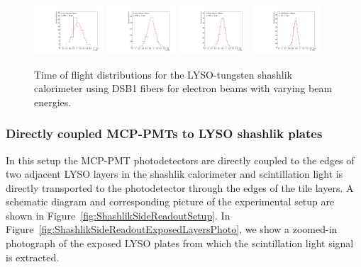 \documentclass[12pt]{article}
\begin{document}
\begin{figure}[H] \centering
\includegraphics[width=0.23\textwidth]{figs/TOF_ShashlikDSB1Fiber_Electron_4GeV} 
\includegraphics[width=0.23\textwidth]{figs/TOF_ShashlikDSB1Fiber_Electron_8GeV} 
\includegraphics[width=0.23\textwidth]{figs/TOF_ShashlikDSB1Fiber_Electron_16GeV} 
\includegraphics[width=0.23\textwidth]{figs/TOF_ShashlikDSB1Fiber_Electron_32GeV} 
\caption{\small Time of flight distributions for the LYSO-tungsten shashlik calorimeter
using DSB1 fibers for electron beams with varying beam energies.} 
\label{fig:ShashlikFiberTOF}
\end{figure}


\subsubsection{Directly coupled MCP-PMTs to LYSO shashlik plates}

In this setup the MCP-PMT photodetectors are directly coupled to the edges of two adjacent LYSO layers in the shashlik
calorimeter and scintillation light is directly transported to the photodetector
through the edges of the tile layers. A schematic diagram and corresponding
picture  of the experimental setup are shown in
Figure~\ref{fig:ShashlikSideReadoutSetup}. In
Figure~\ref{fig:ShashlikSideReadoutExposedLayersPhoto}, we show a zoomed-in
photograph of the exposed LYSO plates from which the scintillation light signal
is extracted.
\end{document}
